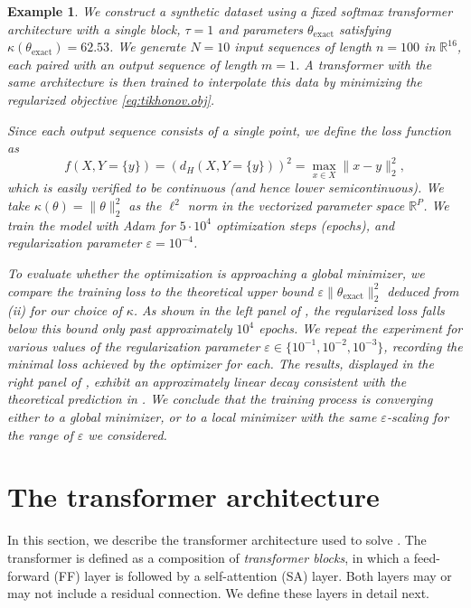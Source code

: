 \documentclass[pdflatex,sn-mathphys-num]{sn-jnl}%
\theoremstyle{thmstyleone}%
\theoremstyle{thmstyletwo}%
\newtheorem{example}[theorem]{Example}
\theoremstyle{thmstylethree}%
\numberwithin{equation}{section}
\newcommand{\R}{\mathbb{R}}
\begin{document}
\begin{example}\label{ex:tikhonov}
We construct a synthetic dataset using a fixed softmax transformer architecture with a single block, $\tau = 1$ and parameters $\theta_{\text{exact}}$ satisfying $\kappa (\theta_{\text{exact}}) = 62.53$. We generate $N = 10$ input sequences of length $n = 100$ in $\R^{16}$, each paired with an output sequence of length $m = 1$. A transformer with the same architecture is then trained to interpolate this data by minimizing the regularized objective \eqref{eq:tikhonov.obj}.

Since each output sequence consists of a single point, we define the loss function as
$$
f(X, Y = \{y\}) = \left(d_H(X, Y = \{ y\})\right)^2 = \max_{x\in X} \| x - y\|_2^2,
$$
which is easily verified to be continuous (and hence lower semicontinuous). We take $\kappa (\theta) = \| \theta \|_2^2$ as the $\ell^2$ norm in the vectorized parameter space $\R^P$. We train the model with Adam \cite{kingma2014adam} for $5 \cdot 10^4$ optimization steps (epochs), and regularization parameter $\varepsilon = 10^{-4}$. 

To evaluate whether the optimization is approaching a global minimizer, we compare the training loss to the theoretical upper bound $\varepsilon \|\theta_{\text{exact}} \|_2^2$ deduced from (ii) for our choice of $\kappa$. As shown in the left panel of , the regularized loss falls below this bound only past approximately $10^4$ epochs. We repeat the experiment for various values of the regularization parameter $\varepsilon \in \{10^{-1}, 10^{-2}, 10^{-3}\}$, recording the minimal loss achieved by the optimizer for each. The results, displayed in the right panel of , exhibit an approximately linear decay consistent with the theoretical prediction in . We conclude that the training process is converging either to a global minimizer, or to a local minimizer with the same $\varepsilon$-scaling for the range of $\varepsilon$ we considered.
\end{example}

\section{The transformer architecture}\label{sec:tfArchitecture}

In this section, we describe the transformer architecture used to solve . 
The transformer is defined as a composition of \emph{transformer blocks}, in which a feed-forward (FF) layer is followed by a self-attention (SA) layer. Both layers may or may not include a residual connection. We define these layers in detail next.
\end{document}
